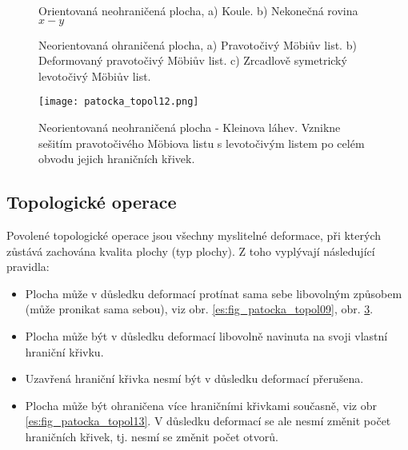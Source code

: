     \begin{figure}[ht!]
      \centering  
      \caption{Orientovaná neohraničená plocha, a) Koule. b) Nekonečná rovina \(x-y\) 
               \cite[s.~54]{Patocka4}} 
      \label{es:fig_patocka_topol10}
    \end{figure}

    \begin{figure}[ht!]
      \centering  
      \caption{Neorientovaná ohraničená plocha, a) Pravotočivý Möbiův list. b) Deformovaný
               pravotočivý Möbiův list. c) Zrcadlově symetrický levotočivý Möbiův list.
               \cite[s.~54]{Patocka4}} 
      \label{es:fig_patocka_topol11}
    \end{figure}
      
    \begin{figure}[ht!]
      \centering  
      \texttt{[image: patocka\_topol12.png]}
      \caption{Neorientovaná neohraničená plocha - Kleinova láhev. Vznikne sešitím pravotočivého
               Möbiova listu s levotočivým listem po celém obvodu jejich hraničních křivek.
               \cite[s.~54]{Patocka4}} 
      \label{es:fig_patocka_topol12}
    \end{figure}
    
    \subsection{Topologické operace}\label{teo:IchapIIsecIIsubII}
      Povolené topologické operace jsou všechny myslitelné deformace, při kterých zůstává zachována 
      kvalita plochy (typ plochy). Z toho vyplývají následující pravidla:
      \begin{itemize}[noitemsep]
        \item Plocha může v důsledku deformací protínat sama sebe libovolným způsobem (může 
              pronikat sama sebou), viz obr. \ref{es:fig_patocka_topol09}, obr. 
              \ref{es:fig_patocka_topol12}.
        \item Plocha může být v důsledku deformací libovolně navinuta na svoji vlastní hraniční  
              křivku.
        \item Uzavřená hraniční křivka nesmí být v důsledku deformací přerušena.
        \item Plocha může být ohraničena více hraničními křivkami současně, viz obr 
              \ref{es:fig_patocka_topol13}. V důsledku deformací se ale nesmí změnit počet 
              hraničních křivek, tj. nesmí se změnit počet otvorů.
     \end{itemize}
      
